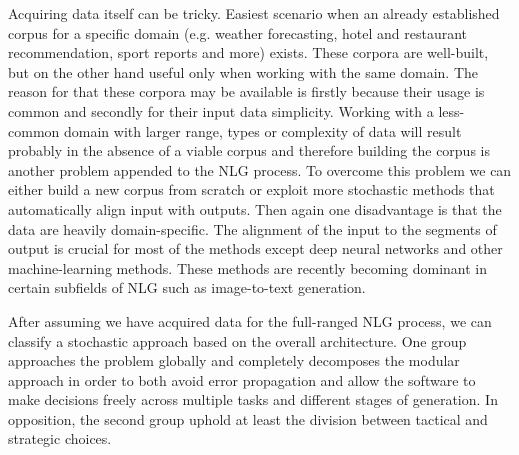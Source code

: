 Acquiring data itself can be tricky. Easiest scenario when an already established corpus for a specific domain (e.g. weather forecasting, hotel and restaurant recommendation, sport reports and more) exists. These corpora are well-built, but on the other hand useful only when working with the same domain. The reason for that these corpora may be available is firstly because their usage is common and secondly for their input data simplicity. Working with a less-common domain with larger range, types or complexity of data will result probably in the absence of a viable corpus and therefore building the corpus is another problem appended to the NLG process. To overcome this problem we can either build a new corpus from scratch or exploit more stochastic methods that automatically align input with outputs. Then again one disadvantage is that the data are heavily domain-specific. The alignment of the input to the segments of output is crucial for most of the methods except deep neural networks and other machine-learning methods. These methods are recently becoming dominant in certain subfields of NLG such as image-to-text generation.

After assuming we have acquired data for the full-ranged NLG process, we can classify a stochastic approach based on the overall architecture. One group approaches the problem globally and completely decomposes the modular approach in order to both avoid error propagation and allow the software to make decisions freely across multiple tasks and different stages of generation. In opposition, the second group uphold at least the division between tactical and strategic choices.  

